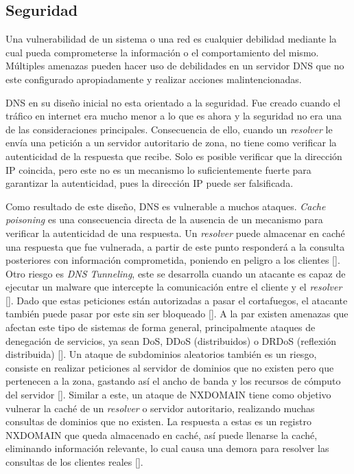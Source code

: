 \subsection{Seguridad}

Una vulnerabilidad de un sistema o una red es cualquier debilidad mediante la cual pueda comprometerse la información o el comportamiento del mismo. Múltiples amenazas pueden hacer uso de debilidades en un servidor DNS que no este configurado apropiadamente y realizar acciones malintencionadas.

DNS en su diseño inicial no esta orientado a la seguridad. Fue creado cuando el tráfico en internet era mucho menor a lo que es ahora y la seguridad no era una de las consideraciones principales. Consecuencia de ello, cuando un \textit{resolver} le envía una petición a un servidor autoritario de zona, no tiene como verificar la autenticidad de la respuesta que recibe. Solo es posible verificar que la dirección IP coincida, pero este no es un mecanismo lo suficientemente fuerte para garantizar la autenticidad, pues la dirección IP puede ser falsificada.

Como resultado de este diseño, DNS es vulnerable a muchos ataques. \textit{Cache poisoning} es una consecuencia directa de la ausencia de un mecanismo para verificar la autenticidad de una respuesta. Un \textit{resolver} puede almacenar en caché una respuesta que fue vulnerada, a partir de este punto responderá a la consulta posteriores con información comprometida, poniendo en peligro a los clientes [\cite{nathan2012berkeley}]. Otro riesgo es \textit{DNS Tunneling}, este se desarrolla cuando un atacante es capaz de ejecutar un malware que intercepte la comunicación entre el cliente y el \textit{resolver} [\cite{kaminsky2004black}]. Dado que estas peticiones están autorizadas a pasar el cortafuegos, el atacante también puede pasar por este sin ser bloqueado [\cite{dns-tunneling}]. A la par existen amenazas que afectan este tipo de sistemas de forma general, principalmente ataques de denegación de servicios, ya sean DoS, DDoS (distribuidos) o DRDoS (reflexión distribuida) [\cite{dns-attacks}]. Un ataque de subdominios aleatorios también es un riesgo, consiste en realizar peticiones al servidor de dominios que no existen pero que pertenecen a la zona, gastando así el ancho de banda y los recursos de cómputo del servidor [\cite{bushart2018dns}]. Similar a este, un ataque de NXDOMAIN tiene como objetivo vulnerar la caché de un \textit{resolver} o servidor autoritario, realizando muchas consultas de dominios que no existen. La respuesta a estas es un registro NXDOMAIN que queda almacenado en caché, así puede llenarse la caché, eliminando información relevante, lo cual causa una demora para resolver las consultas de los clientes reales [\cite{dns-attacks-ident-prot}].

